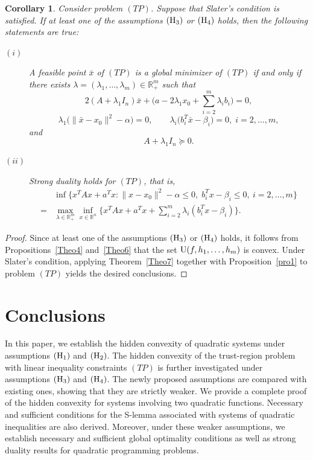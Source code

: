 \documentclass[]{interact}
\theoremstyle{plain}%
\newtheorem{corollary}[theorem]{Corollary}
\theoremstyle{definition}
\theoremstyle{remark}
\begin{document}
	\begin{corollary}\label{cor2}
		Consider problem $(TP)$.
		Suppose that Slater's condition is satisfied.
		If at least one of the assumptions ${\rm (H_3)}$ or ${\rm (H_4)}$ holds, then the following statements are true:
		\begin{description}
			\item[$(i)$]
			A feasible point $\bar x$ of $(TP)$ is a global minimizer of $(TP)$ if and only if there exists
			$\lambda=(\lambda_1,\ldots,\lambda_m)\in \mathbb{R}^m_+$ such that
			$$2(A+\lambda_1 I_n)\bar x
			+\big(a-2\lambda_1 x_0+\sum_{i=2}^{m}\lambda_i b_i\big)=0,$$
			$$\lambda_1\big(\|\bar x-x_0\|^2-\alpha\big)=0,\qquad
			\lambda_i\big(b_i^T\bar x-\beta_i\big)=0,\; i=2,\ldots,m,$$
			and
			$$A+\lambda_1 I_n\succeq 0.$$
			
			\item[$(ii)$]
			Strong duality holds for $(TP)$, that is,
			\begin{align*}
				&\inf \Big\{x^TAx+a^Tx:
				\|x-x_0\|^2-\alpha\leq0,\;
				b_i^Tx-\beta_i\leq0,\ i=2,\ldots,m\Big\} \\
				=&\max_{\lambda\in \mathbb{R}^m_+}
				\inf_{x\in \mathbb{R}^n}
				\bigg\{
				x^TAx+a^Tx
				+\sum_{i=2}^{m}\lambda_i(b_i^Tx-\beta_i)
				\bigg\}.
			\end{align*}
		\end{description}
	\end{corollary}
	
	\begin{proof}
		Since at least one of the assumptions ${\rm (H_3)}$ or ${\rm (H_4)}$ holds,
		it follows from Propositions~\ref{Theo4} and~\ref{Theo6} that the set
		${\rm U}(f,h_1,\ldots,h_m)$ is convex.
		Under Slater's condition, applying Theorem~\ref{Theo7} together with
		Proposition~\ref{pro1} to problem $(TP)$ yields the desired conclusions.
	\end{proof}
	
	
	
	
	\section{Conclusions}
	In this paper, we establish the hidden convexity of quadratic systems under assumptions ${\rm (H_1)}$ and ${\rm (H_2)}$. The hidden convexity of the trust-region problem with linear inequality constraints $(TP)$ is further investigated under assumptions ${\rm (H_3)}$ and ${\rm (H_4)}$. The newly proposed assumptions are compared with existing ones, showing that they are strictly weaker. We provide a complete proof of the hidden convexity for systems involving two quadratic functions. Necessary and sufficient conditions for the S-lemma associated with systems of quadratic inequalities are also derived. Moreover, under these weaker assumptions, we establish necessary and sufficient global optimality conditions as well as strong duality results for quadratic programming problems.
	
\end{document}
